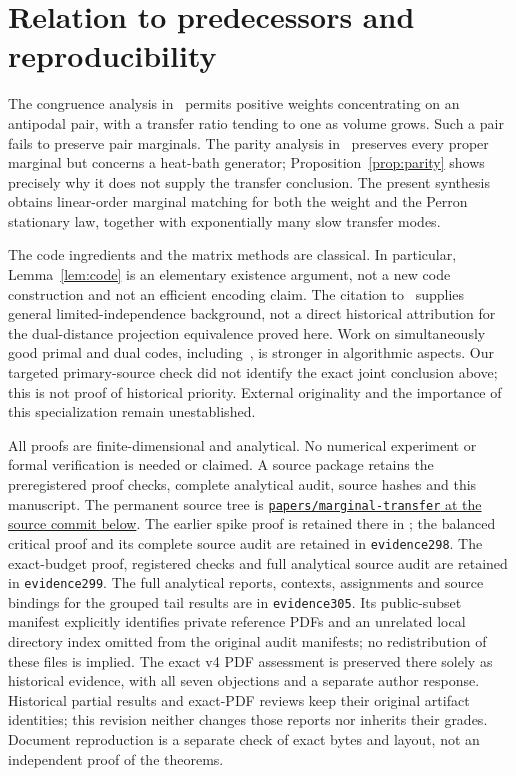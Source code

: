 \documentclass[11pt]{article}
\providecommand{\SourceCommit}{SOURCE-NOT-BUILT}
\begin{document}
\section{Relation to predecessors and reproducibility}
The congruence analysis in~\cite{ErikssonCongruence} permits positive
weights concentrating on an antipodal pair, with a transfer ratio tending
to one as volume grows. Such a pair fails to preserve pair marginals.
The parity analysis in~\cite{ErikssonParity} preserves every proper
marginal but concerns a heat-bath generator; Proposition~\ref{prop:parity}
shows precisely why it does not supply the transfer conclusion.
The present synthesis obtains linear-order marginal matching for both
the weight and the Perron stationary law, together with exponentially
many slow transfer modes.

The code ingredients and the matrix methods are classical. In particular,
Lemma~\ref{lem:code} is an elementary existence argument, not a new code
construction and not an efficient encoding claim. The citation to~\cite{AGM} supplies general limited-independence background, not a direct historical attribution for the dual-distance projection equivalence proved here. Work on simultaneously
good primal and dual codes, including~\cite{BrehmResch}, is stronger in
algorithmic aspects. Our targeted primary-source check did not identify
the exact joint conclusion above; this is not proof of historical priority.
External originality and the importance of this specialization remain
unestablished.

All proofs are finite-dimensional and analytical. No numerical experiment
or formal verification is needed or claimed. A source package retains the
preregistered proof checks, complete analytical audit, source hashes and
this manuscript. The permanent source tree is
\href{https://github.com/lluiseriksson/THE-ERIKSSON-PROGRAMME/tree/\SourceCommit/papers/marginal-transfer}{\texttt{papers/marginal-transfer} at the source commit below}.
The earlier spike proof is retained there in
; the balanced critical proof and
its complete source audit are retained in \texttt{evidence298}.
The exact-budget proof, registered checks and full analytical source
audit are retained in \texttt{evidence299}. The full analytical reports,
contexts, assignments and source bindings for the grouped tail results are
in \texttt{evidence305}. Its public-subset manifest explicitly identifies
private reference PDFs and an unrelated local directory index omitted from
the original audit manifests; no redistribution of these files is implied.
The exact v4 PDF assessment is preserved there solely as historical evidence,
with all seven objections and a separate author response. Historical partial results
and exact-PDF reviews keep their original artifact identities; this
revision neither changes those reports nor inherits their grades.
Document reproduction is a separate check of exact bytes
and layout, not an independent proof of the theorems.
\end{document}
